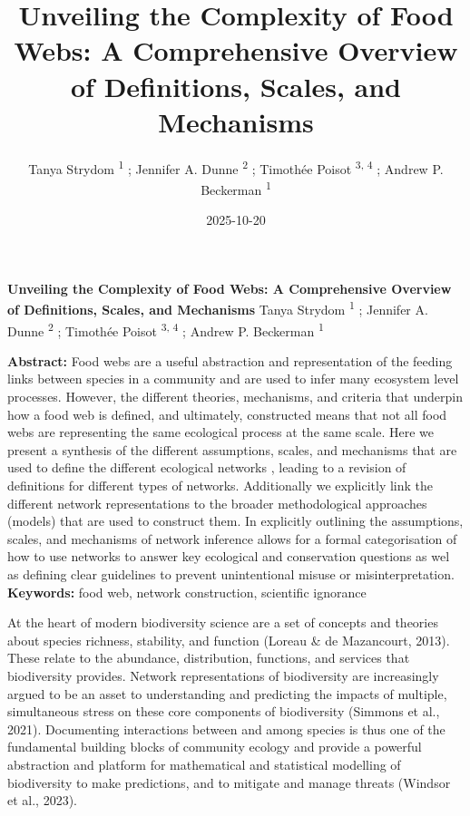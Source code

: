 \documentclass[
]{article}
\title{Unveiling the Complexity of Food Webs: A Comprehensive Overview
of Definitions, Scales, and Mechanisms}
\author{Tanya Strydom %
%
\textsuperscript{%
%
1%
}%
; Jennifer A. Dunne %
%
\textsuperscript{%
%
2%
}%
; Timothée Poisot %
%
\textsuperscript{%
3,%
4%
}%
; Andrew P. Beckerman %
%
\textsuperscript{%
%
1%
}%
}
\date{2025-10-20}
\begin{document}
\thispagestyle{empty}
{\bfseries\sffamily\Large Unveiling the Complexity of Food Webs: A
Comprehensive Overview of Definitions, Scales, and Mechanisms}
\vfil
Tanya Strydom %
%
\textsuperscript{%
%
1%
}%
; Jennifer A. Dunne %
%
\textsuperscript{%
%
2%
}%
; Timothée Poisot %
%
\textsuperscript{%
3,%
4%
}%
; Andrew P. Beckerman %
%
\textsuperscript{%
%
1%
}%

\vfil
{\small
\textbf{Abstract:} Food webs are a useful abstraction and representation
of the feeding links between species in a community and are used to
infer many ecosystem level processes. However, the different theories,
mechanisms, and criteria that underpin how a food web is defined, and
ultimately, constructed means that not all food webs are representing
the same ecological process at the same scale. Here we present a
synthesis of the different assumptions, scales, and mechanisms that are
used to define the different ecological networks , leading to a revision
of definitions for different types of networks. Additionally we
explicitly link the different network representations to the broader
methodological approaches (models) that are used to construct them. In
explicitly outlining the assumptions, scales, and mechanisms of network
inference allows for a formal categorisation of how to use networks to
answer key ecological and conservation questions as wel as defining
clear guidelines to prevent unintentional misuse or misinterpretation.
\vfil
\textbf{Keywords:} %
food web, network construction, %
scientific ignorance%
}
\clearpage
\setcounter{page}{1}
\doublespacing
\linenumbers


At the heart of modern biodiversity science are a set of concepts and
theories about species richness, stability, and function (Loreau \& de
Mazancourt, 2013). These relate to the abundance, distribution,
functions, and services that biodiversity provides. Network
representations of biodiversity are increasingly argued to be an asset
to understanding and predicting the impacts of multiple, simultaneous
stress on these core components of biodiversity (Simmons et al., 2021).
Documenting interactions between and among species is thus one of the
fundamental building blocks of community ecology and provide a powerful
abstraction and platform for mathematical and statistical modelling of
biodiversity to make predictions, and to mitigate and manage threats
(Windsor et al., 2023).
\end{document}

